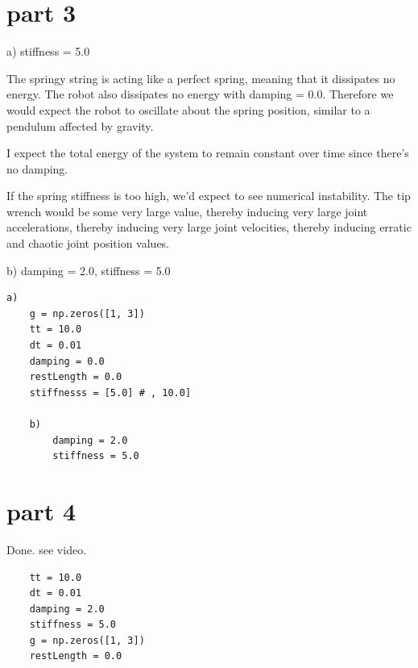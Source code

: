 \documentclass[11pt]{article}
\begin{document}
\section{part 3}
a) stiffness = 5.0

The springy string is acting like a perfect spring, meaning that it dissipates no energy. The robot also dissipates no energy with damping = 0.0. Therefore we would expect the robot to oscillate about the spring position, similar to a pendulum affected by gravity.

I expect the total energy of the system to remain constant over time since there's no damping.

If the spring stiffness is too high, we'd expect to see numerical instability. The tip wrench would be some very large value, thereby inducing very large joint accelerations, thereby inducing very large joint velocities, thereby inducing erratic and chaotic joint position values.

b) damping = 2.0, stiffness = 5.0

\begin{verbatim}
a)
    g = np.zeros([1, 3])
    tt = 10.0
    dt = 0.01
    damping = 0.0
    restLength = 0.0
    stiffnesss = [5.0] # , 10.0]
    
    b)
        damping = 2.0
        stiffness = 5.0
\end{verbatim}


\section{part 4}
Done. see video.

\begin{verbatim}
    tt = 10.0
    dt = 0.01
    damping = 2.0
    stiffness = 5.0
    g = np.zeros([1, 3])
    restLength = 0.0
\end{verbatim}
\end{document}
